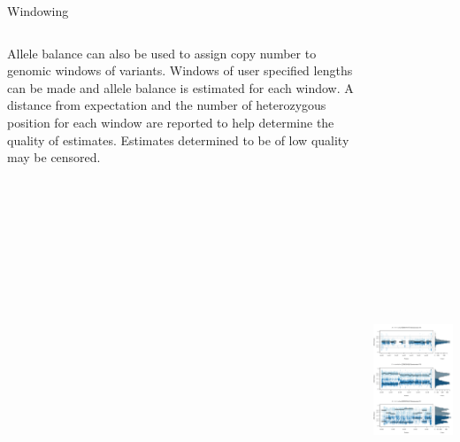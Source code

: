 
\begin{columns}[t]
  \begin{column}{0.65\textwidth}
    \begin{block}{\large Windowing}
      \begin{columns}
        \begin{column}{0.68\textwidth}
\footnotesize
Allele balance can also be used to assign copy number to genomic windows of variants.
Windows of user specified lengths can be made and allele balance is estimated for each window.
A distance from expectation and the number of heterozygous position for each window are reported to help determine the quality of estimates.
Estimates determined to be of low quality may be censored.
        \end{column}
        \begin{column}{0.30\textwidth}
          \includegraphics[height=20cm]{./figures/fig6_exemplars.png}
        \end{column}
      \end{columns}


\end{block}
\end{column}
\end{columns}
